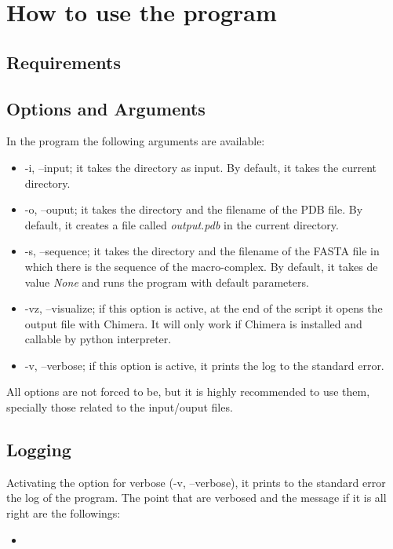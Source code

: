 \documentclass[a4paper,12pt]{report}
\begin{document}
\chapter{How to use the program}

\section{Requirements}

\section{Options and Arguments}

In the program the following arguments are available:

\begin{itemize}
 \item -i, --input; it takes the directory as input. By default, it takes the current directory.
 \item -o, --ouput; it takes the directory and the filename of the PDB file. By default, it creates a file called \textit{output.pdb} in the current directory.
 \item -s, --sequence; it takes the directory and the filename of the FASTA file in which there is the sequence of the macro-complex. By default, it takes de value \textit{None} and runs the program with default parameters.
 \item -vz, --visualize; if this option is active, at the end of the script it opens the output file with Chimera. It will only work if Chimera is installed and callable by python interpreter.
 \item -v, --verbose; if this option is active, it prints the log to the standard error. 
\end{itemize}

All options are not forced to be, but it is highly recommended to use them, specially those related to the input/ouput files.

\section{Logging}

Activating the option for verbose (-v, --verbose), it prints to the standard error the log of the program. The point that are verbosed and the message if it is all right are the followings:

\begin{itemize}
 \item 
\end{itemize}
\end{document}
